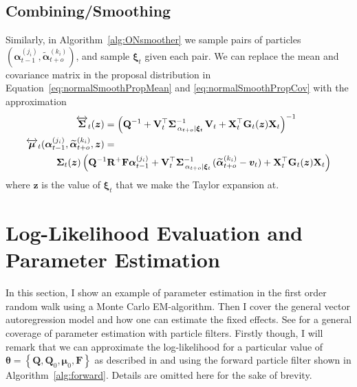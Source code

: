 \documentclass[notitlepage]{article}
\renewcommand{\vec}[1]{\bm{#1}}
\newcommand{\vecLRarrow}[1]{\overleftrightarrow{\vec{#1}}}
\newcommand{\mat}[1]{\mathbf{#1}}
\newcommand{\matLRarrow}[1]{\overleftrightarrow{\mat{#1}}}
\newcommand{\Lbrace}[1]{\left\{ #1\right\}}
\newcommand{\Lparen}[1]{\left( #1\right)}
\newcommand\subCond[3]{#1_{\left. #2 \middle\vert #3\right.}}
\newcommand{\partic}[3]{#1_{#2}^{\Lparen{#3}}}
\newcommand{\particB}[3]{\widetilde{#1}_{#2}^{\Lparen{#3}}}
\begin{document}
\subsection{Combining/Smoothing}
Similarly, in Algorithm~\ref{alg:ONsmoother} we sample pairs of particles 
$(\partic{\vec{\alpha}}{t - 1}{j_i}, \particB{\vec{\alpha}}{t + o}{k_i})$, 
and sample $\vec\xi_t$ given each pair. We can replace the mean and covariance matrix in 
the proposal distribution in Equation~\eqref{eq:normalSmoothPropMean} and 
\eqref{eq:normalSmoothPropCov} with the approximation %
%
\begin{align*}
\matLRarrow\Sigma_t(\vec z) &= \Lparen{
	\mat Q^{-1} + 
	\mat V_t^\top\subCond{\mat\Sigma}{\alpha_{t + o}}{\vec\xi_t}^{-1}\mat V_t + 
	\mat X_t^\top \mat G_t(\vec z) \mat X_t}^{-1}\\
\vecLRarrow\mu_t(\partic{\vec{\alpha}}{t - 1}{j_i}, 
	\particB{\vec{\alpha}}{t + o}{k_i}, \vec z) &=  \\
	&\hspace{-50pt}
	\mat\Sigma_t(\vec z)\Lparen{
		\mat Q^{-1}\mat R^+\mat F\partic{\vec{\alpha}}{t - 1}{j_i} + 
		\mat V_t^\top\subCond{\mat\Sigma}{\alpha_{t + o}}{\vec\xi_t}^{-1}
			(\particB{\vec{\alpha}}{t + o}{k_i} - \vec v_t) + 
		\mat X_t^\top \mat G_t(\vec z) \mat X_t}
\end{align*}%
% 
where $\vec z$ is the value of $\vec\xi_t$ that we make the Taylor expansion at. 





\section{Log-Likelihood Evaluation and Parameter Estimation}
In this section, I show an example of parameter estimation in the first 
order random walk using a Monte Carlo EM-algorithm. Then I cover the 
general vector autoregression model and how one can estimate the fixed 
effects. 
See \cite{kantas15,del10,schon11} for a general coverage of
parameter estimation with particle filters.
Firstly though, I will remark that we 
can approximate the log-likelihood for a particular value of 
$\vec{\theta} = \Lbrace{\mat{Q}, \mat{Q}_0, \vec \mu_0, \mat{F}}$ 
as described in \citet[p. 5]{doucet09} and \citet[p. 193]{malik11} using the forward particle 
filter shown in Algorithm~\ref{alg:forward}. Details are omitted here for 
the sake of brevity.
\end{document}
